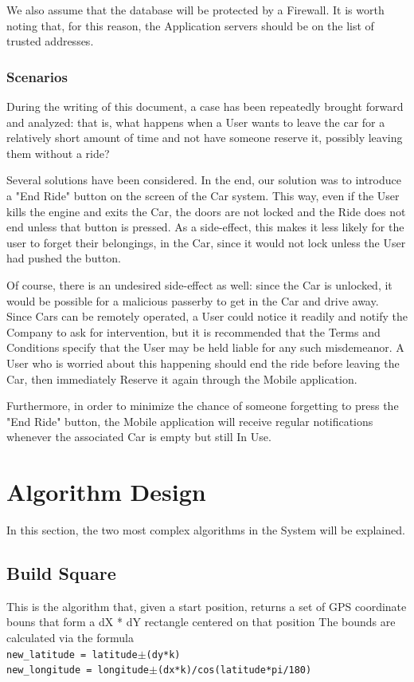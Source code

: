 \documentclass[12pt]{article}
\begin{document}
We also assume that the database will be protected by a Firewall. It is worth noting that, for this reason, the Application servers should be on the list of trusted addresses.

\subsubsection{Scenarios}
During the writing of this document, a case has been repeatedly brought forward and analyzed: that is, what happens when a User wants to leave the car for a relatively short amount of time and not have someone reserve it, possibly leaving them without a ride?

Several solutions have been considered. In the end, our solution was to introduce a "End Ride" button on the screen of the Car system. This way, even if the User kills the engine and exits the Car, the doors are not locked and the Ride does not end unless that button is pressed. As a side-effect, this makes it less likely for the user to forget their belongings, in the Car, since it would not lock unless the User had pushed the button.

Of course, there is an undesired side-effect as well: since the Car is unlocked, it would be possible for a malicious passerby to get in the Car and drive away. Since Cars can be remotely operated, a User could notice it readily and notify the Company to ask for intervention, but it is recommended that the Terms and Conditions specify that the User may be held liable for any such misdemeanor. A User who is worried about this happening should end the ride before leaving the Car, then immediately Reserve it again through the Mobile application.

Furthermore, in order to minimize the chance of someone forgetting to press the "End Ride" button, the Mobile application will receive regular notifications whenever the associated Car is empty but still In Use.

\clearpage
\section{Algorithm Design}
In this section, the two most complex algorithms in the System will be explained.
\subsection{Build Square}
This is the algorithm that, given a start position, returns a set of GPS coordinate bouns that form a dX * dY rectangle centered on that position
The bounds are calculated via the formula\\
\verb&new_latitude = latitude&$\pm$\verb&(dy*k)&\\
\verb&new_longitude = longitude&$\pm$\verb&(dx*k)/cos(latitude*pi/180)&
\end{document}
